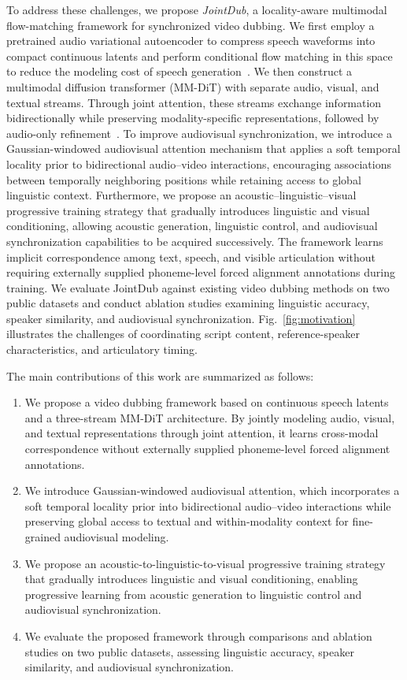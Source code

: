 To address these challenges, we propose \emph{JointDub}, a locality-aware multimodal flow-matching framework for synchronized video dubbing. We first employ a pretrained audio variational autoencoder to compress speech waveforms into compact continuous latents and perform conditional flow matching in this space to reduce the modeling cost of speech generation~\cite{niu2025semantic}. We then construct a multimodal diffusion transformer (MM-DiT) with separate audio, visual, and textual streams. Through joint attention, these streams exchange information bidirectionally while preserving modality-specific representations, followed by audio-only refinement~\cite{esser2024scaling,cheng2025mmaudio}. To improve audiovisual synchronization, we introduce a Gaussian-windowed audiovisual attention mechanism that applies a soft temporal locality prior to bidirectional audio--video interactions, encouraging associations between temporally neighboring positions while retaining access to global linguistic context. Furthermore, we propose an acoustic--linguistic--visual progressive training strategy that gradually introduces linguistic and visual conditioning, allowing acoustic generation, linguistic control, and audiovisual synchronization capabilities to be acquired successively. The framework learns implicit correspondence among text, speech, and visible articulation without requiring externally supplied phoneme-level forced alignment annotations during training. We evaluate JointDub against existing video dubbing methods on two public datasets and conduct ablation studies examining linguistic accuracy, speaker similarity, and audiovisual synchronization. Fig.~\ref{fig:motivation} illustrates the challenges of coordinating script content, reference-speaker characteristics, and articulatory timing.

The main contributions of this work are summarized as follows:
\begin{enumerate}
    \item We propose a video dubbing framework based on continuous speech latents and a three-stream MM-DiT architecture. By jointly modeling audio, visual, and textual representations through joint attention, it learns cross-modal correspondence without externally supplied phoneme-level forced alignment annotations.
    \item We introduce Gaussian-windowed audiovisual attention, which incorporates a soft temporal locality prior into bidirectional audio--video interactions while preserving global access to textual and within-modality context for fine-grained audiovisual modeling.
    \item We propose an acoustic-to-linguistic-to-visual progressive training strategy that gradually introduces linguistic and visual conditioning, enabling progressive learning from acoustic generation to linguistic control and audiovisual synchronization.
    \item We evaluate the proposed framework through comparisons and ablation studies on two public datasets, assessing linguistic accuracy, speaker similarity, and audiovisual synchronization.
\end{enumerate}
